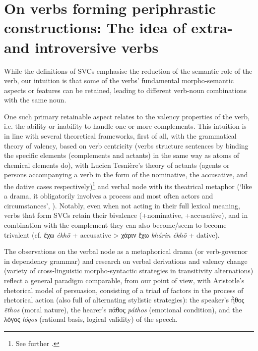 \documentclass[output=paper,colorlinks,citecolor=brown]{langscibook}
\begin{document}
\section{On verbs forming periphrastic constructions: The idea of extra- and introversive verbs}\label{Section5Rhet}

While the definitions of SVCs emphasise the reduction of the semantic role of the verb, our intuition is that some of the verbs’ fundamental morpho-semantic aspects or features can be retained, leading to different verb-noun combinations with the same noun.

One such primary retainable aspect relates to the valency properties of the verb, i.e. the ability or inability to handle one or more complements. This intuition is in line with several theoretical frameworks, first of all, with the grammatical theory of valency, based on verb centricity (verbs structure sentences by binding the specific elements (complements and actants) in the same way as atoms of chemical elements do), with Lucien Tesnière’s theory of actants (agents or persons accompanying a verb in the form of the nominative, the accusative, and the dative cases respectively)\footnote{See further \citet[100--109]{Tesniere2015}.} and verbal node with its theatrical metaphor (‘like a drama, it obligatorily involves a process and most often actors and circumstances', \citealt[97]{Tesniere2015}). Notably, even when not acting in their full lexical meaning, verbs that form SVCs retain their bivalence (+nominative, +accusative), and in combination with the complement they can also become/seem to become trivalent (cf. ἔχω \textit{ékhō} + accusative > χάριν ἔχω \textit{khárin ékhō} + dative).

The observations on the verbal node as a metaphorical drama (or verb-governor in dependency grammar) and research on verbal derivations and valency change (variety of cross-linguistic morpho-syntactic strategies in transitivity alternations) reflect a general paradigm comparable, from our point of view, with Aristotle’s rhetorical model of persuasion, consisting of a triad of factors in the process of rhetorical action (also full of alternating stylistic strategies): the speaker’s ἦθος \textit{ē̃thos} (moral nature), the hearer’s πάθος \textit{páthos} (emotional condition), and the λόγος \textit{lógos} (rational basis, logical validity) of the speech. 
\end{document}
